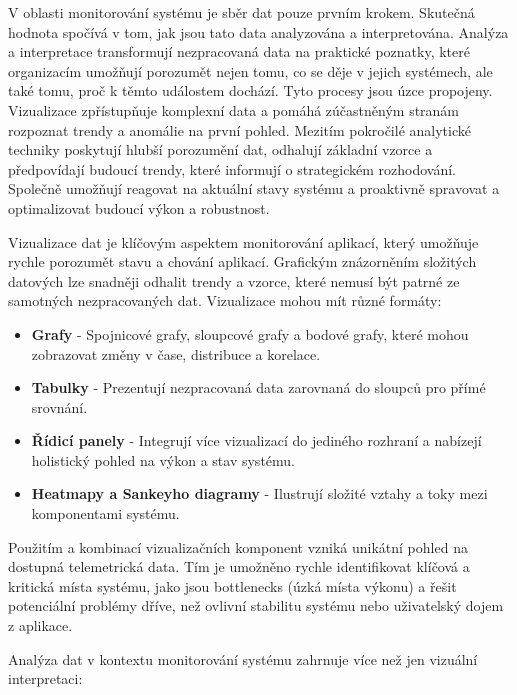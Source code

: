 
V oblasti monitorování systému je sběr dat pouze prvním krokem. Skutečná hodnota spočívá v tom, jak jsou tato data analyzována a interpretována. Analýza a interpretace transformují nezpracovaná data na praktické poznatky, které organizacím umožňují porozumět nejen tomu, co se děje v jejich systémech, ale také tomu, proč k těmto událostem dochází. Tyto procesy jsou úzce propojeny. Vizualizace zpřístupňuje komplexní data a pomáhá zúčastněným stranám rozpoznat trendy a anomálie na první pohled. Mezitím pokročilé analytické techniky poskytují hlubší porozumění dat, odhalují základní vzorce a předpovídají budoucí trendy, které informují o strategickém rozhodování. Společně umožňují reagovat na aktuální stavy systému a proaktivně spravovat a optimalizovat budoucí výkon a robustnost. \cite{Majors2022}


Vizualizace dat je klíčovým aspektem monitorování aplikací, který umožňuje rychle porozumět stavu a chování aplikací. Grafickým znázorněním složitých datových lze snadněji odhalit trendy a vzorce, které nemusí být patrné ze samotných nezpracovaných dat. Vizualizace mohou mít různé formáty:

\begin{itemize}
    \item \textbf{Grafy} - Spojnicové grafy, sloupcové grafy a bodové grafy, které mohou zobrazovat změny v čase, distribuce a korelace.
    \item \textbf{Tabulky} - Prezentují nezpracovaná data zarovnaná do sloupců pro přímé srovnání.
    \item \textbf{Řídicí panely} - Integrují více vizualizací do jediného rozhraní a nabízejí holistický pohled na výkon a stav systému.
    \item \textbf{Heatmapy a Sankeyho diagramy} - Ilustrují složité vztahy a toky mezi komponentami systému.
\end{itemize}

Použitím a kombinací vizualizačních komponent vzniká unikátní pohled na dostupná telemetrická data. Tím je umožněno rychle identifikovat klíčová a kritická místa systému, jako jsou bottlenecks (úzká místa výkonu) a řešit potenciální problémy dříve, než ovlivní stabilitu systému nebo uživatelský dojem z aplikace.


Analýza dat v kontextu monitorování systému zahrnuje více než jen vizuální interpretaci:

